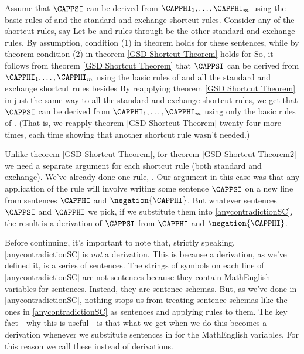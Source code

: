\begin{PROOF}
Assume that $\CAPPSI$ can be derived from $\CAPPHI_1,\ldots,\CAPPHI_{\integer{m}}$ using the basic rules of \GSD{} and the standard and exchange shortcut rules. 
Consider any of the shortcut rules, say  
Let  be  and rules  through  be the other standard and exchange rules.
By assumption, condition (1) in theorem  holds for these sentences, while by theorem  condition (2) in theorem \ref{GSD Shortcut Theorem} holds for  
So, it follows from theorem \ref{GSD Shortcut Theorem} that $\CAPPSI$ can be derived from $\CAPPHI_1,\ldots,\CAPPHI_{\integer{m}}$ using the basic rules of \GSD{} and all the standard and exchange shortcut rules besides  By reapplying theorem \ref{GSD Shortcut Theorem} in just the same way to all the standard and exchange shortcut rules, we get that $\CAPPSI$ can be derived from $\CAPPHI_1,\ldots,\CAPPHI_{\integer{m}}$ using only the basic rules of \GSD{}. 
(That is, we reapply theorem \ref{GSD Shortcut Theorem} twenty four more times, each time showing that another shortcut rule wasn't needed.)
\end{PROOF}

\bigskip
\noindent{}Unlike theorem \ref{GSD Shortcut Theorem}, for theorem \ref{GSD Shortcut Theorem2} we need a separate argument for each shortcut rule (both standard and exchange). 
We've already done one rule, . 
Our argument in this case was that any application of the rule will involve writing some sentence $\CAPPSI$ on a new line from sentences $\CAPPHI$ and $\negation{\CAPPHI}$. 
But whatever sentences $\CAPPSI$ and $\CAPPHI$ we pick, if we substitute them into \ref{anycontradictionSC}, the result is a derivation of $\CAPPSI$ from $\CAPPHI$ and $\negation{\CAPPHI}$. 

Before continuing, it's important to note that, strictly speaking, \ref{anycontradictionSC} is \emph{not} a derivation. 
This is because a derivation, as we've defined it, is a series of \GSL{} sentences. 
The strings of symbols on each line of \ref{anycontradictionSC} are not \GSL{} sentences because they contain MathEnglish variables for \GSL{} sentences. 
Instead, they are sentence schemas.
But, as we've done in \ref{anycontradictionSC}, nothing stops us from treating sentence schemas like the ones in \ref{anycontradictionSC} as \GSL{} sentences and applying rules to them. 
The key fact---why this is useful---is that what we get when we do this becomes a derivation whenever we substitute \GSL{} sentences in for the MathEnglish variables. 
For this reason we call these   instead of derivations. 

